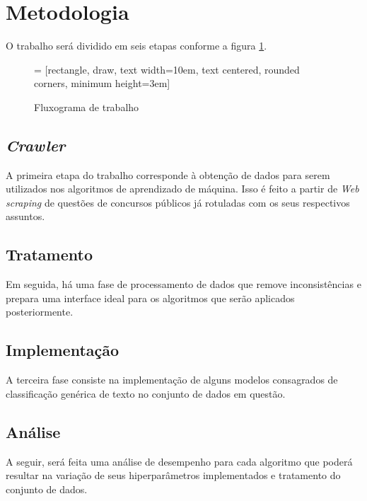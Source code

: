 \section{Metodologia}
\label{sec:metodology}
O trabalho será dividido em seis etapas conforme a figura \ref{fig:fluxogram}.

\begin{figure}[!ht]
  \centering
   = [rectangle, draw, text width=10em, text centered, rounded      corners, minimum height=3em]
  \caption{Fluxograma de trabalho}
  \label{fig:fluxogram}
\end{figure}

\subsection{\textit{Crawler}}
A primeira etapa do trabalho corresponde à obtenção de dados para serem utilizados nos algoritmos de aprendizado de máquina. Isso é feito a partir de \textit{Web scraping} de questões de concursos públicos já rotuladas com os seus respectivos assuntos.
\subsection{Tratamento}
Em seguida, há uma fase de processamento de dados que remove inconsistências e prepara uma interface ideal para os algoritmos que serão aplicados posteriormente.
\subsection{Implementação}
A terceira fase consiste na implementação de alguns modelos consagrados de classificação genérica de texto no conjunto de dados em questão.
\subsection{Análise}
A seguir, será feita uma análise de desempenho para cada algoritmo que poderá resultar na variação de seus hiperparâmetros implementados e tratamento do conjunto de dados.
